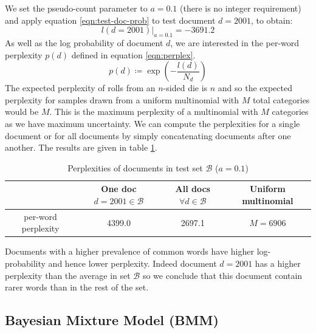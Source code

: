 \documentclass[]{article}
\newcommand{\Bcal}{\mathcal{B}}
\begin{document}
 We set the pseudo-count parameter to $a=0.1$ (there is no integer requirement) and apply equation \ref{eqn:test-doc-prob} to test document $d=2001$, to obtain:
 \begin{equation}
 	l(d=2001)|_{a=0.1} = -3691.2
 \end{equation}
 As well as the log probability of document $d$, we are interested in the per-word perplexity $p(d)$ defined in equation \ref{eqn:perplex}.
%
\begin{equation}
p(d) \coloneqq \exp \left(- \frac{l(d)}{N_d} \right)
\label{eqn:perplex}
\end{equation}
%
The expected perplexity of rolls from an $n$-sided die is $n$ and so the expected perplexity for samples drawn from a uniform multinomial with $M$ total categories would be $M$. This is the maximum perplexity of a multinomial with $M$ categories as we have maximum uncertainty. We can compute the perplexities for a single document or for all documents by simply concatenating documents after one another. The results are given in table \ref{tab:perplex}.
%
\begin{table}[!h]
	\centering
	\begin{tabular}{c | c c c}
		& One doc $d=2001 \in \Bcal$ & All docs $\forall d \in \Bcal$ & Uniform multinomial \\ \hline
		per-word perplexity & 4399.0 & 2697.1 & $M=6906$
	\end{tabular}
\caption{Perplexities of documents in test set $\Bcal$ ($a=0.1$)}
\label{tab:perplex}
\end{table}
%
Documents with a higher prevalence of common words have higher log-probability and hence lower perplexity. Indeed document $d=2001$ has a higher perplexity than the average in set $\Bcal$ so we conclude that this document contain rarer words than in the rest of the set.

\clearpage
\subsection{Bayesian Mixture Model (BMM)}
\end{document}
